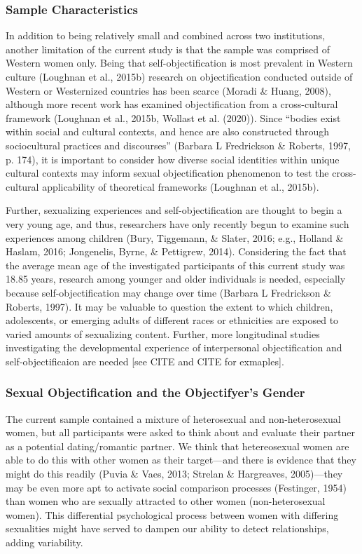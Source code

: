 \documentclass[man]{apa6}
\begin{document}
\subsubsection{Sample Characteristics}\label{sample-characteristics}

In addition to being relatively small and combined across two
institutions, another limitation of the current study is that the sample
was comprised of Western women only. Being that self-objectification is
most prevalent in Western culture (Loughnan et al., 2015b) research on
objectification conducted outside of Western or Westernized countries
has been scarce (Moradi \& Huang, 2008), although more recent work has
examined objectification from a cross-cultural framework (Loughnan et
al., 2015b, Wollast et al. (2020)). Since \enquote{bodies exist within
social and cultural contexts, and hence are also constructed through
sociocultural practices and discourses} (Barbara L Fredrickson \&
Roberts, 1997, p. 174), it is important to consider how diverse social
identities within unique cultural contexts may inform sexual
objectification phenomenon to test the cross-cultural applicability of
theoretical frameworks (Loughnan et al., 2015b).

Further, sexualizing experiences and self-objectification are thought to
begin a very young age, and thus, researchers have only recently begun
to examine such experiences among children (Bury, Tiggemann, \& Slater,
2016; e.g., Holland \& Haslam, 2016; Jongenelis, Byrne, \& Pettigrew,
2014). Considering the fact that the average mean age of the
investigated participants of this current study was 18.85 years,
research among younger and older individuals is needed, especially
because self-objectification may change over time (Barbara L Fredrickson
\& Roberts, 1997). It may be valuable to question the extent to which
children, adolescents, or emerging adults of different races or
ethnicities are exposed to varied amounts of sexualizing content.
Further, more longitudinal studies investigating the developmental
experience of interpersonal objectification and self-objectificaion are
needed {[}see CITE and CITE for exmaples{]}.

\subsubsection{Sexual Objectification and the Objectifyer's
Gender}\label{sexual-objectification-and-the-objectifyers-gender}

The current sample contained a mixture of heterosexual and
non-heterosexual women, but all participants were asked to think about
and evaluate their partner as a potential dating/romantic partner. We
think that hetereosexual women are able to do this with other women as
their target---and there is evidence that they might do this readily
(Puvia \& Vaes, 2013; Strelan \& Hargreaves, 2005)---they may be even
more apt to activate social comparison processes (Festinger, 1954) than
women who are sexually attracted to other women (non-heterosexual
women). This differential psychological process between women with
differing sexualities might have served to dampen our ability to detect
relationships, adding variability.
\end{document}
